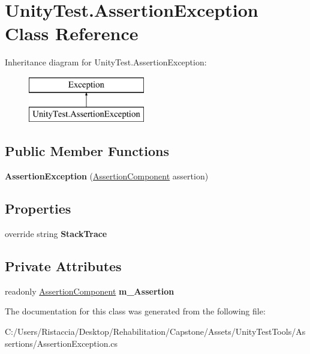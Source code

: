 \hypertarget{class_unity_test_1_1_assertion_exception}{}\section{Unity\+Test.\+Assertion\+Exception Class Reference}
\label{class_unity_test_1_1_assertion_exception}
Inheritance diagram for Unity\+Test.\+Assertion\+Exception\+:\begin{figure}[H]
\begin{center}
\leavevmode
\includegraphics[height=2.000000cm]{class_unity_test_1_1_assertion_exception}
\end{center}
\end{figure}
\subsection*{Public Member Functions}
\begin{DoxyCompactItemize}
\item 
\mbox{\label{class_unity_test_1_1_assertion_exception_aa4ae0bbd2c098ac4ca2d129d2c831811}} 
{\bfseries Assertion\+Exception} (\hyperlink{class_unity_test_1_1_assertion_component}{Assertion\+Component} assertion)
\end{DoxyCompactItemize}
\subsection*{Properties}
\begin{DoxyCompactItemize}
\item 
\mbox{\label{class_unity_test_1_1_assertion_exception_af78cc782519aa57592721809e9bcf0bc}} 
override string {\bfseries Stack\+Trace}
\end{DoxyCompactItemize}
\subsection*{Private Attributes}
\begin{DoxyCompactItemize}
\item 
\mbox{\label{class_unity_test_1_1_assertion_exception_a31324c1899af581d983b9a38bc7bffdc}} 
readonly \hyperlink{class_unity_test_1_1_assertion_component}{Assertion\+Component} {\bfseries m\+\_\+\+Assertion}
\end{DoxyCompactItemize}


The documentation for this class was generated from the following file\+:\begin{DoxyCompactItemize}
\item 
C\+:/\+Users/\+Ristaccia/\+Desktop/\+Rehabilitation/\+Capstone/\+Assets/\+Unity\+Test\+Tools/\+Assertions/Assertion\+Exception.\+cs\end{DoxyCompactItemize}
